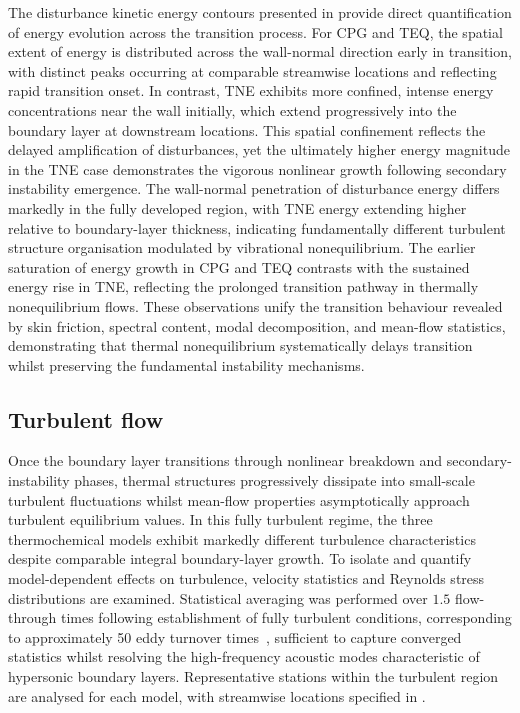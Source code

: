 The disturbance kinetic energy contours presented in  provide direct quantification of energy evolution across the transition process. For \gls{CPG} and \gls{TEQ}, the spatial extent of energy is distributed across the wall-normal direction early in transition, with distinct peaks occurring at comparable streamwise locations and reflecting rapid transition onset. In contrast, \gls{TNE} exhibits more confined, intense energy concentrations near the wall initially, which extend progressively into the boundary layer at downstream locations. This spatial confinement reflects the delayed amplification of disturbances, yet the ultimately higher energy magnitude in the \gls{TNE} case demonstrates the vigorous nonlinear growth following secondary instability emergence. The wall-normal penetration of disturbance energy differs markedly in the fully developed region, with \gls{TNE} energy extending higher relative to boundary-layer thickness, indicating fundamentally different turbulent structure organisation modulated by vibrational nonequilibrium. The earlier saturation of energy growth in \gls{CPG} and \gls{TEQ} contrasts with the sustained energy rise in \gls{TNE}, reflecting the prolonged transition pathway in thermally nonequilibrium flows. These observations unify the transition behaviour revealed by skin friction, spectral content, modal decomposition, and mean-flow statistics, demonstrating that thermal nonequilibrium systematically delays transition whilst preserving the fundamental instability mechanisms.

\subsection{Turbulent flow}

Once the boundary layer transitions through nonlinear breakdown and secondary-instability phases, thermal structures progressively dissipate into small-scale turbulent fluctuations whilst mean-flow properties asymptotically approach turbulent equilibrium values. In this fully turbulent regime, the three thermochemical models exhibit markedly different turbulence characteristics despite comparable integral boundary-layer growth. To isolate and quantify model-dependent effects on turbulence, velocity statistics and Reynolds stress distributions are examined. Statistical averaging was performed over $1.5$ flow-through times following establishment of fully turbulent conditions, corresponding to approximately 50 eddy turnover times~\citep{Pirozzoli2004}, sufficient to capture converged statistics whilst resolving the high-frequency acoustic modes characteristic of hypersonic boundary layers. Representative stations within the turbulent region are analysed for each model, with streamwise locations specified in .

